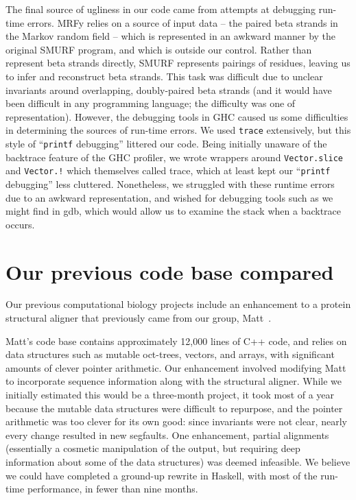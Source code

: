 \documentclass[preprint,nonatbib,blockstyle,nocopyrightspace,times]{sigplanconf}
\let\cite\citep
\begin{document}
The final source of ugliness in our code came from attempts at debugging 
run-time errors.
MRFy relies on a source of input data -- the paired beta 
strands in the Markov random field -- which is represented in an awkward manner 
by the original SMURF program, and which is outside our control.
Rather than 
represent beta strands directly, SMURF represents pairings of residues, leaving 
us to infer and reconstruct beta strands.
This task was difficult due to 
unclear invariants around overlapping, doubly-paired beta strands (and it would 
have been difficult in any programming language; the difficulty was one of 
representation).
However, the debugging tools in GHC caused us some 
difficulties in determining the sources of run-time errors.
We used 
\texttt{trace} extensively, but this style of ``\texttt{printf} debugging'' 
littered our code.
Being initially unaware of the backtrace feature of the GHC 
profiler, we wrote wrappers around \texttt{Vector.slice} and \texttt{Vector.!} 
which themselves called trace, which at least kept our ``\texttt{printf} 
debugging'' less cluttered.
Nonetheless, we struggled with these runtime errors 
due to an awkward representation, and wished for debugging tools such as we 
might find in gdb, which would allow us to examine the stack when a backtrace 
occurs.
 
 
\section{Our previous code base compared}

Our previous computational biology projects include an enhancement to a protein 
structural aligner that previously came from our group, Matt~\cite{Menke:2008wu}.

Matt's code base contains approximately 12,000 lines of C++ code, and relies on 
data structures such as mutable oct-trees, vectors, and arrays, with 
significant amounts of clever pointer arithmetic.
Our enhancement involved 
modifying Matt to incorporate sequence information along with the structural 
aligner.
While we initially estimated this would be a three-month project, it 
took most of a year because the mutable data structures were difficult to 
repurpose, and the pointer arithmetic was too clever for its own good: since 
invariants were not clear, nearly every change resulted in new segfaults.
One 
enhancement, partial alignments (essentially a cosmetic manipulation of the 
output, but requiring deep information about some of the data structures) was 
deemed infeasible.
We believe we could have completed a ground-up rewrite in 
Haskell, with most of the run-time performance, in fewer than nine months.
\end{document}
